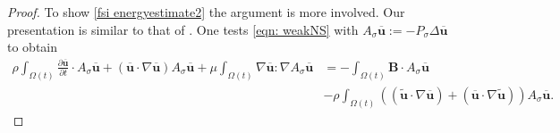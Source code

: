 \documentclass[a4paper]{amsart}
\numberwithin{equation}{section}
\newcommand{\ddt}[1]{\frac{\partial #1}{\partial t}}
\newcommand{\grad}{\nabla}
\theoremstyle{plain}
\newcommand{\mbf}[1]{\mathbf{#1}}
\begin{document}
\begin{proof}
	To show \eqref{fsi energyestimate2} the argument is more involved.
	Our presentation is similar to that of \cite{salvi1988navier}.
	One tests \eqref{eqn: weakNS} with $A_{\sigma} \overline{\mbf{u}} := -P_\sigma \Delta \overline{\mbf{u}}$ to obtain
	\begin{align*}
		\rho \int_{\Omega(t)} \ddt{\overline{\mbf{u}}} \cdot A_{\sigma}\overline{\mbf{u}} + \left(\overline{\mbf{u}} \cdot \grad \overline{\mbf{u}}\right) A_{\sigma}\overline{\mbf{u}} + \mu \int_{\Omega(t)} \grad\overline{\mbf{u}}:\grad A_{\sigma} \overline{\mbf{u}}&= -\int_{\Omega(t)} \mbf{B} \cdot A_{\sigma} \overline{\mbf{u}}\\
        &-\rho \int_{\Omega(t)} \left((\widetilde{\mbf{u}} \cdot \grad \overline{\mbf{u}}) + (\overline{\mbf{u}} \cdot \grad\widetilde{\mbf{u}}) \right)A_{\sigma} \overline{\mbf{u}}.
	\end{align*}


\end{proof}
\end{document}
